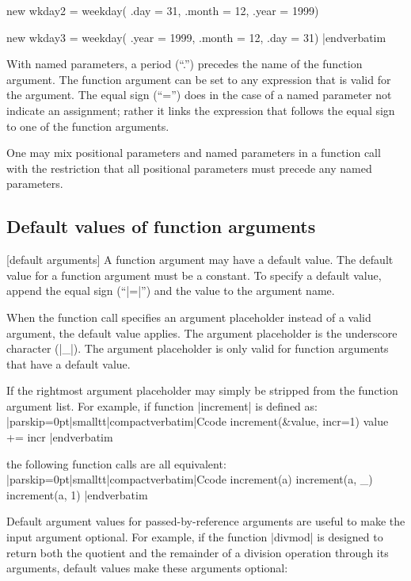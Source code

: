   new wkday2 = weekday( .day = 31, .month = 12, .year = 1999)

  new wkday3 = weekday( .year = 1999, .month = 12, .day = 31)
|endverbatim\endlistingx

With named parameters, a period (``.'') precedes the name of the function
argument. The function argument can be set to any expression that is valid
for the argument. The equal sign (``='') does in the case of a named
parameter not indicate an assignment; rather it links the expression that
follows the equal sign to one of the function arguments.

One may mix positional parameters and named parameters in a function call with
the restriction that all positional parameters must precede any named
parameters.


\subsection{Default values of function arguments}
 [default arguments]
 
\noindent{}%
A function argument may have a default value. The default value for a function
argument must be a constant. To specify a default value, append the equal sign
(``|=|'') and the value to the argument name.

When the function call specifies an argument placeholder instead of a valid
argument, the default value applies. The argument placeholder is the
underscore character (|_|). The argument placeholder is only valid for
function arguments that have a default value.

If the rightmost argument placeholder may simply be stripped from the function
argument list. For example, if function |increment| is defined as:
\listingx\verbatim|parskip=0pt|smalltt|compactverbatim|Ccode
increment(&value, incr=1) value += incr
|endverbatim\endlistingx

the following function calls are all equivalent:
\listingx\verbatim|parskip=0pt|smalltt|compactverbatim|Ccode
increment(a)
increment(a, _)
increment(a, 1)
|endverbatim\endlistingx

Default argument values for passed-by-reference arguments are useful to make
the input argument optional. For example, if the function |divmod| is
designed to return both the quotient and the remainder of a division operation
through its arguments, default values make these arguments optional:

